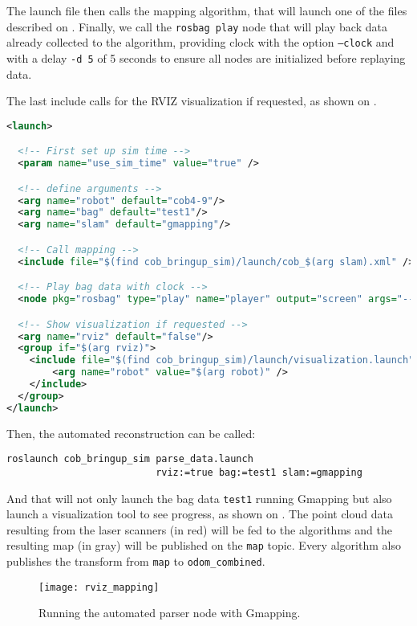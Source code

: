The launch file then calls the mapping algorithm, that will launch one of the files described on . Finally, we call the \texttt{rosbag play} node that will play back data already collected to the algorithm, providing clock with the option \texttt{--clock} and with a delay \texttt{-d 5} of 5 seconds to ensure all nodes are initialized before replaying data.

The last include calls for the RVIZ visualization if requested, as shown on .

\begin{lstlisting}[caption={Automated data parser.},label={lst:parser},language=XML]
<launch>

  <!-- First set up sim time -->
  <param name="use_sim_time" value="true" />

  <!-- define arguments -->
  <arg name="robot" default="cob4-9"/>
  <arg name="bag" default="test1"/>
  <arg name="slam" default="gmapping"/>

  <!-- Call mapping -->
  <include file="$(find cob_bringup_sim)/launch/cob_$(arg slam).xml" />

  <!-- Play bag data with clock -->
  <node pkg="rosbag" type="play" name="player" output="screen" args="--clock -q -d 5 $(find cob_bringup_sim)/bags/$(arg bag).bag"/>

  <!-- Show visualization if requested -->
  <arg name="rviz" default="false"/>
  <group if="$(arg rviz)">
    <include file="$(find cob_bringup_sim)/launch/visualization.launch" >
        <arg name="robot" value="$(arg robot)" />
    </include>
  </group>
</launch>
\end{lstlisting}

Then, the automated reconstruction can be called:

\begin{verbatim}
roslaunch cob_bringup_sim parse_data.launch
                          rviz:=true bag:=test1 slam:=gmapping
\end{verbatim}

And that will not only launch the bag data \texttt{test1} running Gmapping but also launch a visualization tool to see progress, as shown on . The point cloud data resulting from the laser scanners (in red) will be fed to the algorithms and the resulting map (in gray) will be published on the \texttt{map} topic. Every algorithm also publishes the transform from \texttt{map} to \texttt{odom\_combined}.

\begin{figure}[!ht]
    \centering
    \texttt{[image: rviz\_mapping]}
    \caption{Running the automated parser node with Gmapping.}
    \label{fig:rviz_mapping}
\end{figure}

